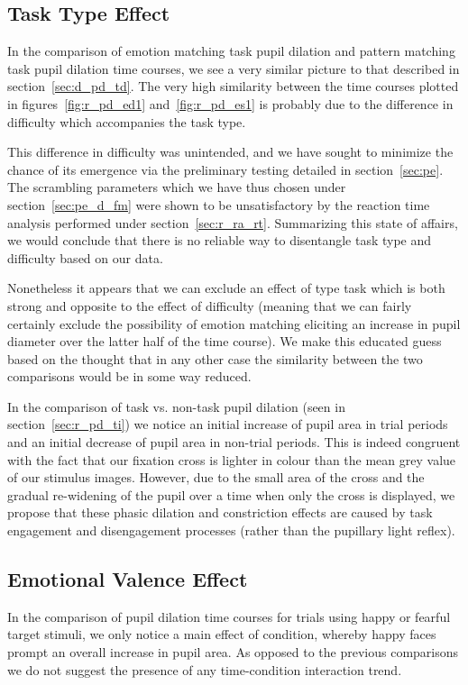 	\subsection{Task Type Effect}
	    In the comparison of emotion matching task pupil dilation and pattern matching task pupil dilation time courses, we see a very similar picture to that described in section~\ref{sec:d_pd_td}.
	    The very high similarity between the time courses plotted in figures~\ref{fig:r_pd_ed1} and~\ref{fig:r_pd_es1} is probably due to the difference in difficulty which accompanies the task type.
	    
	    This difference in difficulty was unintended, and we have sought to minimize the chance of its emergence via the preliminary testing detailed in section~\ref{sec:pe}.
	    The scrambling parameters which we have thus chosen under section~\ref{sec:pe_d_fm} were shown to be unsatisfactory by the reaction time analysis performed under section~\ref{sec:r_ra_rt}.
	    Summarizing this state of affairs, we would conclude that there is no reliable way to disentangle task type and difficulty based on our data.
	    
	    Nonetheless it appears that we can exclude an effect of type task which is both strong and opposite to the effect of difficulty 
	    (meaning that we can fairly certainly exclude the possibility of emotion matching eliciting an increase in pupil diameter over the latter half of the time course).  
	    We make this educated guess based on the thought that in any other case the similarity between the two comparisons would be in some way reduced.
	    
	    In the comparison of task vs. non-task pupil dilation (seen in section~\ref{sec:r_pd_ti}) we notice an initial increase of pupil area in trial periods and an initial decrease of pupil area in non-trial periods.
	    This is indeed congruent with the fact that our fixation cross is lighter in colour than the mean grey value of our stimulus images.
	    However, due to the small area of the cross and the gradual re-widening of the pupil over a time when only the cross is displayed, we propose that these phasic dilation and constriction effects are caused by task engagement and disengagement processes (rather than the pupillary light reflex).
	\subsection{Emotional Valence Effect}
	    In the comparison of pupil dilation time courses for trials using happy or fearful target stimuli, we only notice a main effect of condition, whereby happy faces prompt an overall increase in pupil area. 
	    As opposed to the previous comparisons we do not suggest the presence of any time-condition interaction trend.
	    
